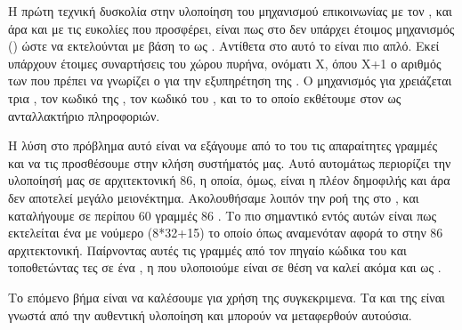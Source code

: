 Η πρώτη τεχνική δυσκολία στην υλοποίηση του μηχανισμού επικοινωνίας με
τον , και άρα και με τις  ευκολίες
που προσφέρει, είναι πως στο  δεν υπάρχει έτοιμος μηχανισμός
() ώστε να εκτελούνται  με βάση το  ως .
Αντίθετα στο  αυτό το  είναι πιο απλό. Εκεί υπάρχουν έτοιμες
συναρτήσεις του χώρου πυρήνα\cite{KVMhyper},
ονόματι Χ,  όπου Χ+1 ο αριθμός των  που πρέπει να
γνωρίζει ο  για την εξυπηρέτηση της . Ο  μηχανισμός
για   χρειάζεται τρια , τον κωδικό της , τον
κωδικό του , και το  το οποίο
εκθέτουμε στον  ως ανταλλακτήριο πληροφοριών.
\newline

Η λύση στο πρόβλημα αυτό είναι να εξάγουμε από το  του  τις
απαραίτητες γραμμές και να τις προσθέσουμε στην κλήση συστήματός μας.
Αυτό αυτομάτως περιορίζει την υλοποίησή μας σε αρχιτεκτονική 86,
η οποία, όμως, είναι η πλέον δημοφιλής και άρα δεν αποτελεί
μεγάλο μειονέκτημα. Ακολουθήσαμε λοιπόν την ροή της 
στο , και καταλήγουμε σε περίπου 60 γραμμές 86 . Το
πιο σημαντικό εντός αυτών είναι πως εκτελείται ένα  με
νούμερο (8*32+15) το οποίο όπως αναμενόταν αφορά το 
στην 86 αρχιτεκτονική. Παίρνοντας αυτές τις γραμμές από τον
πηγαίο κώδικα του  και τοποθετώντας τες σε ένα ,
η  που υλοποιούμε είναι σε θέση να καλεί 
ακόμα και ως .
\newline

Το επόμενο βήμα είναι να καλέσουμε  για
χρήση της  συγκεκριμενα. Τα  και  της 
είναι γνωστά από την αυθεντική υλοποίηση και μπορούν να μεταφερθούν αυτούσια.
\newline

